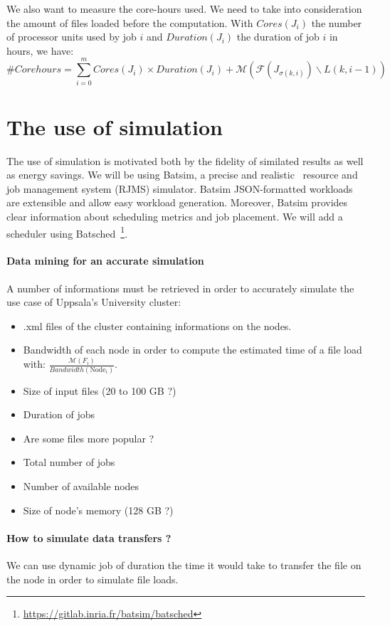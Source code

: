 \documentclass[a4paper]{article}
\newcommand{\Node}[1]{\ensuremath{\mathrm{Node}_{#1}}\xspace}
\newcommand{\inputs}{\ensuremath{\mathcal{F}}\xspace}
\newcommand{\memory}{\ensuremath{\mathcal{M}}\xspace}
\newcommand{\duration}{\mathit{Duration}\xspace}
\newcommand{\core}{\mathit{Cores}\xspace}
\newcommand{\live}{\ensuremath{L}\xspace}
\begin{document}
We also want to measure the core-hours used. We need to take into consideration the amount of files loaded before the computation.
With $\core(J_i)$ the number of processor units used by job $i$ and $\duration(J_i)$ the duration of job $i$ in hours, we have:
$$
	\#Corehours = \sum^{m}_{i = 0} \core(J_i) \times \duration(J_i) + \memory(\inputs\left(J_{\sigma(k,i)}\right) \backslash \live(k,i-1))
$$

\section{The use of simulation}

The use of simulation is motivated both by the fidelity of similated results as well as energy savings. 
We will be using Batsim, a precise and realistic~\cite{Batsim} resource and job management system (RJMS) simulator.
Batsim JSON-formatted workloads are extensible and allow easy workload generation. 
Moreover, Batsim provides clear information about scheduling metrics and job placement.
We will add a scheduler using Batsched~\footnote{\url{https://gitlab.inria.fr/batsim/batsched}}.

\paragraph{Data mining for an accurate simulation}
A number of informations must be retrieved in order to accurately 
simulate the use case of Uppsala's University cluster:
\begin{itemize}
	\item	.xml files of the cluster containing informations on the nodes.
	\item	Bandwidth of each node in order to compute the estimated time of a file load with: $\frac{\memory(F_i)}{\mathit{Bandwidth(\Node{i})}}$.
	\item	Size of input files (20 to 100 GB ?)
	\item	Duration of jobs
	\item	Are some files more popular ?
	\item	Total number of jobs
	\item	Number of available nodes
	\item	Size of node's memory (128 GB ?)
\end{itemize}

\paragraph{How to simulate data transfers ?}
We can use dynamic job of duration the time it would take to transfer the file on the node in order
to simulate file loads.

\printbibliography
\end{document}
